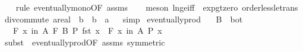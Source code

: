 \begin{isabellebody}
%
\isadelimproof
\ \ %
\endisadelimproof
%
\isatagproof
{}\isamarkupfalse%
\ {\isacharparenleft}{\kern0pt}rule\ eventually{\isacharunderscore}{\kern0pt}mono{\isacharbrackleft}{\kern0pt}OF\ assms{\isacharparenleft}{\kern0pt}{}{\isacharparenright}{\kern0pt}{\isacharbrackright}{\kern0pt}{\isacharparenright}{\kern0pt}\isanewline
\ \ \isamarkupfalse%
\ {\isacharparenleft}{\kern0pt}meson\ ln{\isacharunderscore}{\kern0pt}ge{\isacharunderscore}{\kern0pt}iff\ \ exp{\isacharunderscore}{\kern0pt}gt{\isacharunderscore}{\kern0pt}zero\ order{\isacharunderscore}{\kern0pt}less{\isacharunderscore}{\kern0pt}le{\isacharunderscore}{\kern0pt}trans{\isacharparenright}{\kern0pt}%
\endisatagproof
{\isafoldproof}%
%
\isadelimproof
\isanewline
%
\endisadelimproof
\isanewline
{}\isamarkupfalse%
\ div{\isacharunderscore}{\kern0pt}commute{\isacharcolon}{\kern0pt}\ {\isachardoublequoteopen}{\isacharparenleft}{\kern0pt}a{\isacharcolon}{\kern0pt}{\isacharcolon}{\kern0pt}real{\isacharparenright}{\kern0pt}\ {\isacharslash}{\kern0pt}\ b\ {\isacharequal}{\kern0pt}\ {\isacharparenleft}{\kern0pt}{}{\isacharslash}{\kern0pt}b{\isacharparenright}{\kern0pt}\ {\isacharasterisk}{\kern0pt}\ a{\isachardoublequoteclose}%
\isadelimproof
\ %
\endisadelimproof
%
\isatagproof
{}\isamarkupfalse%
\ simp%
\endisatagproof
{\isafoldproof}%
%
\isadelimproof
%
\endisadelimproof
\isanewline
\isanewline
{}\isamarkupfalse%
\ eventually{\isacharunderscore}{\kern0pt}prod{}{\isacharprime}{\kern0pt}{\isacharcolon}{\kern0pt}\isanewline
\ \ \ {\isachardoublequoteopen}B\ {\isasymnoteq}\ bot{\isachardoublequoteclose}\isanewline
\ \ \ {\isachardoublequoteopen}{\isacharparenleft}{\kern0pt}{\isasymforall}\isactrlsub F\ x\ in\ A\ {\isasymtimes}\isactrlsub F\ B{\isachardot}{\kern0pt}\ P\ {\isacharparenleft}{\kern0pt}fst\ x{\isacharparenright}{\kern0pt}{\isacharparenright}{\kern0pt}\ {\isasymlongleftrightarrow}\ {\isacharparenleft}{\kern0pt}{\isasymforall}\isactrlsub F\ x\ in\ A{\isachardot}{\kern0pt}\ P\ x{\isacharparenright}{\kern0pt}{\isachardoublequoteclose}\isanewline
%
\isadelimproof
\ \ %
\endisadelimproof
%
\isatagproof
{}\isamarkupfalse%
\ {\isacharparenleft}{\kern0pt}subst\ {\isacharparenleft}{\kern0pt}{}{\isacharparenright}{\kern0pt}\ eventually{\isacharunderscore}{\kern0pt}prod{}{\isacharbrackleft}{\kern0pt}OF\ assms{\isacharparenleft}{\kern0pt}{}{\isacharparenright}{\kern0pt}{\isacharcomma}{\kern0pt}\ symmetric{\isacharbrackright}{\kern0pt}{\isacharparenright}{\kern0pt}\isanewline

\end{isabellebody}
